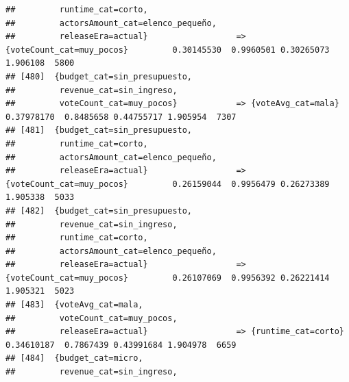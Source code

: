 \documentclass[
]{article}
\begin{document}
\begin{verbatim}
##         runtime_cat=corto,                                                                                                      
##         actorsAmount_cat=elenco_pequeño,                                                                                        
##         releaseEra=actual}                  => {voteCount_cat=muy_pocos}         0.30145530  0.9960501 0.30265073 1.906108  5800
## [480]  {budget_cat=sin_presupuesto,                                                                                             
##         revenue_cat=sin_ingreso,                                                                                                
##         voteCount_cat=muy_pocos}            => {voteAvg_cat=mala}                0.37978170  0.8485658 0.44755717 1.905954  7307
## [481]  {budget_cat=sin_presupuesto,                                                                                             
##         runtime_cat=corto,                                                                                                      
##         actorsAmount_cat=elenco_pequeño,                                                                                        
##         releaseEra=actual}                  => {voteCount_cat=muy_pocos}         0.26159044  0.9956479 0.26273389 1.905338  5033
## [482]  {budget_cat=sin_presupuesto,                                                                                             
##         revenue_cat=sin_ingreso,                                                                                                
##         runtime_cat=corto,                                                                                                      
##         actorsAmount_cat=elenco_pequeño,                                                                                        
##         releaseEra=actual}                  => {voteCount_cat=muy_pocos}         0.26107069  0.9956392 0.26221414 1.905321  5023
## [483]  {voteAvg_cat=mala,                                                                                                       
##         voteCount_cat=muy_pocos,                                                                                                
##         releaseEra=actual}                  => {runtime_cat=corto}               0.34610187  0.7867439 0.43991684 1.904978  6659
## [484]  {budget_cat=micro,                                                                                                       
##         revenue_cat=sin_ingreso,                                                                                                

\end{verbatim}
\end{document}
